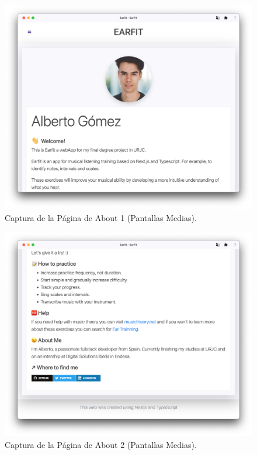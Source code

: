 \documentclass[12pt,twoside,titlepage]{report}
\begin{document}
{\begin{figure}[H]
    \centering
    \includegraphics[scale=0.3]{Capturas Earfit/Tablet/About1}
    \caption{Captura de la Página de About 1 (Pantallas Medias).}
    \label{fig:TabletAbout1}
\end{figure}

\begin{figure}[H]
    \centering
    \includegraphics[scale=0.3]{Capturas Earfit/Tablet/About2}
    \caption{Captura de la Página de About 2 (Pantallas Medias).}
    \label{fig:TabletAbout2}
\end{figure}

}
\end{document}
